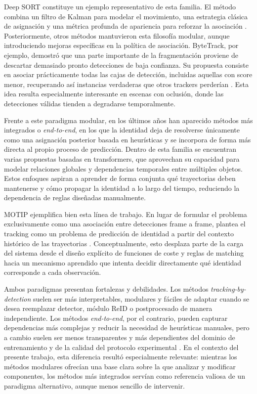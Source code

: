 \documentclass[../MAIN.tex]{subfiles}
\begin{document}
Deep SORT constituye un ejemplo representativo de esta familia. El método combina un filtro de Kalman para modelar el movimiento, una estrategia clásica de asignación y una métrica profunda de apariencia para reforzar la asociación \parencite{wojke2017deepsort}. Posteriormente, otros métodos mantuvieron esta filosofía modular, aunque introduciendo mejoras específicas en la política de asociación. ByteTrack, por ejemplo, demostró que una parte importante de la fragmentación proviene de descartar demasiado pronto detecciones de baja confianza. Su propuesta consiste en asociar prácticamente todas las cajas de detección, incluidas aquellas con score menor, recuperando así instancias verdaderas que otros trackers perderían \parencite{zhang2022bytetrack}. Esta idea resulta especialmente interesante en escenas con oclusión, donde las detecciones válidas tienden a degradarse temporalmente.

Frente a este paradigma modular, en los últimos años han aparecido métodos más integrados o \textit{end-to-end}, en los que la identidad deja de resolverse únicamente como una asignación posterior basada en heurísticas y se incorpora de forma más directa al propio proceso de predicción. Dentro de esta familia se encuentran varias propuestas basadas en transformers, que aprovechan su capacidad para modelar relaciones globales y dependencias temporales entre múltiples objetos. Estos enfoques aspiran a aprender de forma conjunta qué trayectorias deben mantenerse y cómo propagar la identidad a lo largo del tiempo, reduciendo la dependencia de reglas diseñadas manualmente.

MOTIP ejemplifica bien esta línea de trabajo. En lugar de formular el problema exclusivamente como una asociación entre detecciones frame a frame, plantea el tracking como un problema de predicción de identidad a partir del contexto histórico de las trayectorias \parencite{motip2024}. Conceptualmente, esto desplaza parte de la carga del sistema desde el diseño explícito de funciones de coste y reglas de matching hacia un mecanismo aprendido que intenta decidir directamente qué identidad corresponde a cada observación.

Ambos paradigmas presentan fortalezas y debilidades. Los métodos \textit{tracking-by-detection} suelen ser más interpretables, modulares y fáciles de adaptar cuando se desea reemplazar detector, módulo ReID o postprocesado de manera independiente. Los métodos \textit{end-to-end}, por el contrario, pueden capturar dependencias más complejas y reducir la necesidad de heurísticas manuales, pero a cambio suelen ser menos transparentes y más dependientes del dominio de entrenamiento y de la calidad del protocolo experimental \parencite{zhang2022bytetrack,motip2024}. En el contexto del presente trabajo, esta diferencia resultó especialmente relevante: mientras los métodos modulares ofrecían una base clara sobre la que analizar y modificar componentes, los métodos más integrados servían como referencia valiosa de un paradigma alternativo, aunque menos sencillo de intervenir.
\end{document}
